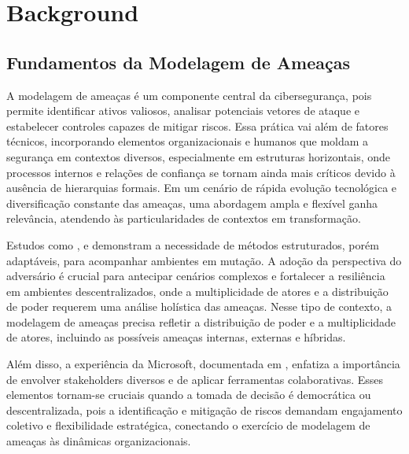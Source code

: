 
%

\chapter{Background}
\label{cha:background}

\glsresetall

\section{Fundamentos da Modelagem de Ameaças}
\label{sec:fundamentos_da_modelagem_de_ameacas}

A modelagem de ameaças é um componente central da cibersegurança, pois
permite identificar ativos valiosos, analisar potenciais vetores de
ataque e estabelecer controles capazes de mitigar riscos. Essa prática
vai além de fatores técnicos, incorporando elementos organizacionais e
humanos que moldam a segurança em contextos diversos, especialmente em
estruturas horizontais, onde processos internos e relações de confiança
se tornam ainda mais críticos devido à ausência de hierarquias formais.
Em um cenário de rápida evolução tecnológica e diversificação constante
das ameaças, uma abordagem ampla e flexível ganha relevância, atendendo
às particularidades de contextos em transformação.

Estudos como \cite{ThreatModelingAsABasisForSecurityRequirements},
\cite{AdvancedThreatModeling} e
\cite{DemystifyingTheThreatModelingProcess} demonstram a necessidade
de métodos estruturados, porém adaptáveis, para acompanhar ambientes
em mutação. A adoção da perspectiva do adversário \cite{AHybridThreatModelingMethod}
é crucial para antecipar cenários complexos e fortalecer a resiliência
em ambientes descentralizados, onde a multiplicidade de atores e a
distribuição de poder requerem uma análise holística das ameaças.
Nesse tipo de contexto, a modelagem de ameaças precisa refletir
a distribuição de poder e a multiplicidade de atores, incluindo as
possíveis ameaças internas, externas e híbridas.

Além disso, a experiência da Microsoft, documentada em
\cite{ExperiencesThreatModelingAtMicrosoft}, enfatiza a importância de
envolver stakeholders diversos e de aplicar ferramentas colaborativas.
Esses elementos tornam-se cruciais quando a tomada de decisão é
democrática ou descentralizada, pois a identificação e mitigação de
riscos demandam engajamento coletivo e flexibilidade estratégica,
conectando o exercício de modelagem de ameaças às dinâmicas
organizacionais.

